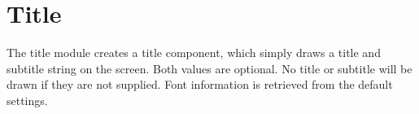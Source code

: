 \section{Title}
The title module creates a title component, which simply draws a title and subtitle string on the screen. Both values are optional. No title or subtitle will be drawn if they are not supplied. Font information is retrieved from the default settings.
